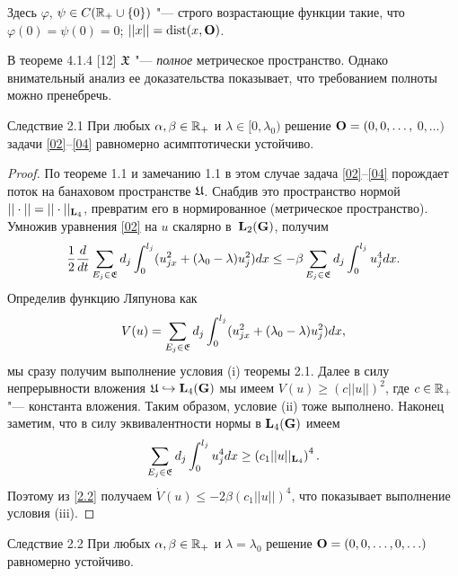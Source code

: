 Здесь $\varphi$, $\psi\in C ({\Bbb R}_+\cup\{0\})$ "--- строго возрастающие функции такие, что $\varphi (0)=\psi (0)=0$; $||x||={\rm dist} (x, {\bf O})$.

\smallskip

\begin{remark}[2.2] В теореме 4.1.4 [12] $\frak X$ "--- {\it полное} метрическое пространство. Однако внимательный анализ ее доказательства показывает, что требованием полноты можно пренебречь.\end{remark}

\smallskip

\begin{newthm}{Следствие 2.1} При любых $\alpha, \beta\in \Bbb R_+$ и $\lambda\in [0, \lambda_0)$ решение ${\bf O}= (0,0,\ldots,$ $ 0,\ldots)$ задачи \eqref{02}--\eqref{04} равномерно асимптотически устойчиво.\end{newthm}

 \begin{proof} По теореме 1.1 и замечанию 1.1 в этом случае задача \eqref{02}--\eqref{04} порождает поток на банаховом пространстве $\frak U$. 
Снабдив это пространство нормой $||\cdot||=||\cdot||_{{\bf L}_4}$, превратим его в нормированное (метрическое пространство). 
Умножив уравнения \eqref{02} на $u$ скалярно в~${\bf L}_2 ({\bf G})$, получим \begin{equation}\frac{1}{2}\frac{d}{dt} \sum_{E_j\in\frak E}d_j \int_0^{l_j} (u^2_{jx}+(\lambda_0-\lambda)u^2_j)dx\leq -\beta\sum_{E_j\in\frak E}d_j \int_0^{l_j} u^4_{j}dx.\label{2.2}\end{equation} Определив функцию Ляпунова как $$V(u)= \sum_{E_j\in\frak E}d_j \int_0^{l_j} (u^2_{jx}+(\lambda_0-\lambda)u^2_j)dx,$$  мы сразу получим выполнение условия (i) теоремы 2.1. 
Далее в силу непрерывности вложения $\frak U\hookrightarrow {\bf L}_4 ({\bf G})$ мы имеем $V(u)\geq (c||u||)^2$, где $c\in \Bbb R_+$ "--- константа вложения. Таким образом, условие (ii) тоже выполнено. Наконец заметим, что в силу эквивалентности нормы в ${\bf L}_4 ({\bf G})$ имеем $$\sum_{E_j\in\frak E}d_j \int_0^{l_j} u^4_{j}dx\geq \left(c_1 ||u||_{{\bf L}_4}\right)^4.$$ Поэтому из \eqref{2.2} получаем $\dot V (u)\leq -2\beta\left(c_1 ||u||\right)^4$, что показывает выполнение условия (iii).  \end{proof}

\smallskip

\begin{newthm}{Следствие 2.2}  При любых $\alpha, \beta\in \Bbb R_+$ и $\lambda= \lambda_0$ решение ${\bf O}= (0, 0, \ldots, 0, \ldots)$  равномерно устойчиво.\end{newthm}

